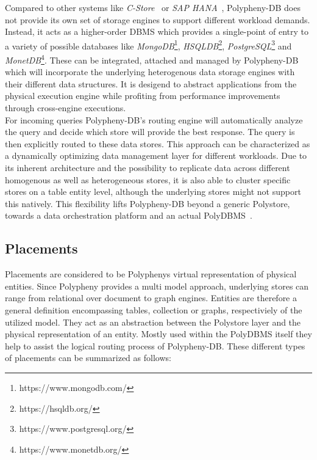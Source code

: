 Compared to other systems like \textit{C-Store}~\cite{cstore_2005} or \textit{SAP HANA}~\cite{hana_2012}, 
Polypheny-DB does not provide its own set of storage engines to support 
different workload demands.\\
Instead, it acts as a higher-order DBMS which provides a single-point of entry to 
a variety of possible databases like 
\textit{MongoDB}\footnote{https://www.mongodb.com/}, 
\textit{HSQLDB}\footnote{https://hsqldb.org/},
\textit{PostgreSQL}\footnote{https://www.postgresql.org/} 
and \textit{MonetDB}\footnote{https://www.monetdb.org/}. 
These can be integrated, attached and managed by Polypheny-DB which will incorporate the underlying 
heterogenous data storage engines with their different data structures. 
It is desigend to abstract applications from the physical execution engine while profiting from 
performance improvements through cross-engine executions. 
\\
For incoming queries Polypheny-DB's routing engine will automatically analyze the query and decide 
which store will provide the best response. The query is then explicitly routed to these data stores. 
This approach can be characterized as a dynamically optimizing data management layer for different workloads.
Due to its inherent architecture and the possibility to replicate data across different homogenous as well as heterogeneous stores, it is also able to cluster specific stores 
on a table entity level, although the underlying stores might not support this natively. 
This flexibility lifts Polypheny-DB beyond a generic Polystore, towards a data orchestration platform and an actual PolyDBMS~\cite{polypheny2021}. 




\subsection{Placements}
Placements are considered to be Polyphenys virtual representation of physical entities.
Since Polypheny provides a multi model approach, underlying stores can range from relational over document to graph engines. 
Entities are therefore a general definition encompassing tables, collection or graphs, respectiviely of the utilized model.
They act as an abstraction between the Polystore layer and the physical representation of an entity. 
Mostly used within the PolyDBMS itself they help to assist the logical routing process of Polypheny-DB.
These different types of placements can be summarized as follows:


